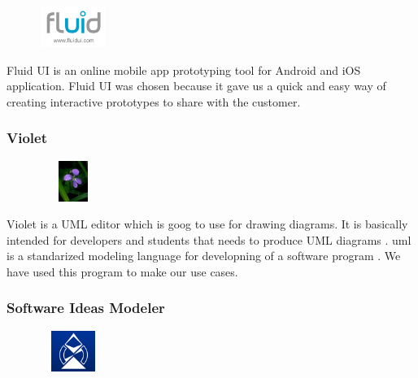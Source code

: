 \begin{figure}
  \vspace{-35pt}
  \begin{center}
    \includegraphics[width=0.2\textwidth, height=50px]{fluidui}
  \end{center}

\end{figure}

Fluid UI \cite{bib:fui} is an online mobile app prototyping tool for Android and iOS application. Fluid UI was chosen because it gave us a quick and easy way of creating interactive prototypes to share with the customer.

\subsubsection{Violet}

\begin{figure}
  \vspace{-125pt}
  \begin{center}
    \includegraphics[width=0.2\textwidth, height=50px]{violet.jpg}
  \end{center}

\end{figure}
Violet is a UML editor which is goog to use for drawing diagrams. It is \newline
basically intended for developers and students that needs to produce UML \newline
diagrams \cite{bib:violet}. \gls{uml} is a standarized modeling language for developning\newline
of a software program \cite{bib:lmu}. We have used this program to make our use cases.

\subsubsection{Software Ideas Modeler}

\begin{figure}
  \vspace{-35pt}
  \begin{center}
    \includegraphics[width=0.2\textwidth, height=50px]{ideasmodeler}
  \end{center}

\end{figure}

